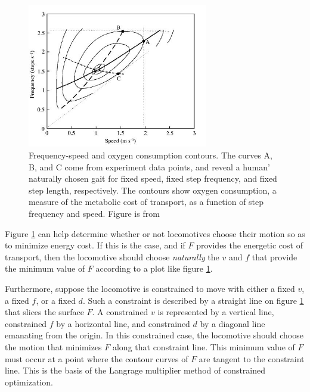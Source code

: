 \begin{figure}[h]		%
\begin{centering}
\includegraphics[width=0.7\textwidth]{Figures/Optimization}\par
\end{centering}
\caption[Plot: Frequency-Speed and Oxgen Consumption Contours]{Frequency-speed and oxygen consumption contours. The curves A, B, and C come from experiment data points, and reveal a human' naturally chosen gait for fixed speed, fixed step frequency, and fixed step length, respectively. The contours show  oxygen consumption, a measure of the metabolic cost of transport, as a function of step frequency and speed. Figure is from \cite{needed} }
\label{fig:Optimization}
\end{figure}
%

Figure \ref{fig:Optimization} can help determine whether or not locomotives choose their motion so as to minimize energy cost. If this is the case, and if $F$ provides the energetic cost of transport, then the locomotive should choose \textit{naturally} the $v$ and $f$ that provide the minimum value of $F$ according to a plot like figure \ref{fig:Optimization}.

Furthermore, suppose the locomotive is constrained to move with either a fixed $v$, a fixed $f$, or a fixed $d$. Such a constraint is described by a straight line on figure \ref{fig:Optimization} that slices the surface $F$. A constrained $v$ is represented by a vertical line, constrained $f$ by a horizontal line, and constrained $d$ by a diagonal line emanating from the origin. In this constrained case, the locomotive should choose the motion that minimizes $F$ along that constraint line. This minimum value of $F$ must occur at a point where the contour curves of $F$ are tangent to the constraint line. This is the basis of the Langrage multiplier method of constrained optimization.


